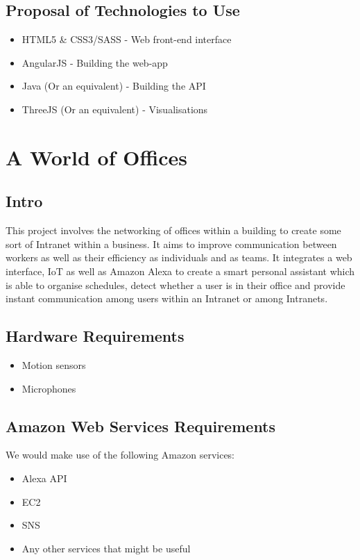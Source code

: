\documentclass{article}
\begin{document}
	\subsection{Proposal of Technologies to Use}
		\begin{itemize}
			\item HTML5 \& CSS3/SASS - Web front-end interface
			\item AngularJS - Building the web-app
			\item Java (Or an equivalent) - Building the API
			\item ThreeJS (Or an equivalent) - Visualisations
		\end{itemize}
		
\cleardoublepage
	\section{A World of Offices}
	\subsection{Intro}
		This project involves the networking of offices within a building to create some sort of Intranet within a business. It aims to improve communication between workers as well as their efficiency as individuals and as teams. It integrates a web interface, IoT as well as Amazon Alexa to create a smart personal assistant which is able to organise schedules, detect whether a user is in their office and  provide instant communication among users within an Intranet or among Intranets.
	\subsection{Hardware Requirements}
	
	\begin{itemize}
		\item Motion sensors
		\item Microphones
	\end{itemize}
	\subsection{Amazon Web Services Requirements}
	We would make use of the following Amazon services:
	\begin{itemize}
		\item Alexa API
		\item EC2
		\item SNS
		\item Any other services that might be useful
	\end{itemize}
\end{document}

